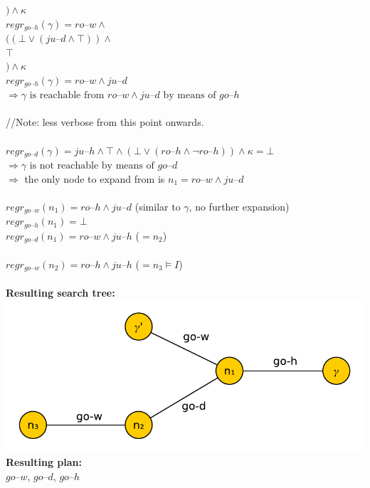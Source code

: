 \documentclass[11pt,a4paper]{article}
\newcommand{\h}[0]{\text{--}}
\begin{document}
\hphantom{aaaa}$) \land \kappa$\\
$regr_{go\h h}(\gamma)=ro\h w\land$\\
\hphantom{aaaa}$((\bot \lor (ju\h d\land \top))\land$\\
\hphantom{aaaaaa}$\top$\\
\hphantom{aaaa}$) \land \kappa$\\
$regr_{go\h h}(\gamma)=ro\h w\land ju\h d$\\
$\Rightarrow \gamma \text{ is reachable from }ro\h w\land ju\h d \text{ by means of } go\h h$\\
\\
//Note: less verbose from this point onwards.\\
\\
$regr_{go\h d}(\gamma)=ju\h h\land \top \land (\bot \lor (ro\h h \land \neg ro\h h)) \land \kappa= \bot$\\
$\Rightarrow \gamma \text{ is not reachable by means of } go\h d$\\
$\Rightarrow$ the only node to expand from is $n_1=ro\h w\land ju\h d$\\
\\
$regr_{go\h w}(n_1)=ro\h h\land ju\h d$ \hphantom{aaaa}(similar to $\gamma$, no further expansion)\\
$regr_{go\h h}(n_1)=\bot$\\
$regr_{go\h d}(n_1)=ro\h w\land ju\h h$ \hphantom{aaaa}($=n_2$)\\
\\
$regr_{go\h w}(n_2)=ro\h h\land ju\h h$ \hphantom{aaaa}($=n_3\models I$)\\
\\
\textbf{Resulting search tree:}\\
\includegraphics[scale=0.7]{search_tree}\\
\textbf{Resulting plan:}\\
$go\h w$, $go\h d$, $go\h h$
\end{document}
